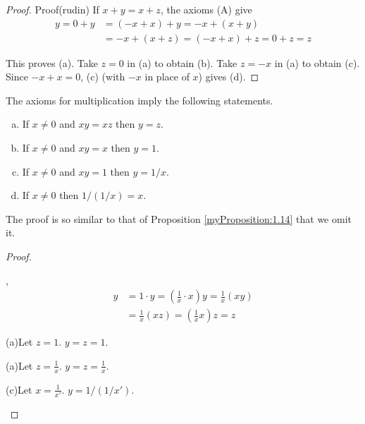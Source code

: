 \begin{proof}
    Proof(rudin)
    If $x + y =x + z$, the axioms (A) give
    \begin{align*}
        y =0+y&=(-x+x)+y=-x+(x+y)\\
        &=-x+(x+z)=(-x+x)+z=0+z=z
    \end{align*}

    This proves (a). Take $z = 0$ in (a) to obtain (b). 
    Take $z= -x$ in (a) to obtain (c).
    Since $-x + x = 0$, (c) (with $-x$ in place of $x$) gives (d).
\end{proof}


\begin{myProposition}
    \label{myProposition:1.15}
    The axioms for multiplication imply the following statements.
    \begin{enumerate}[(a)]
        \item If $x\neq0$ and $xy=xz$ then $y=z$.
        \item If $x\neq0$ and $xy=x$ then $y=1$.
        \item If $x\neq0$ and $xy=1$ then $y=1/x$.
        \item If $x\neq0$ then $1/(1/x) = x$.
    \end{enumerate}
\end{myProposition}

The proof is so similar to that of Proposition \ref{myProposition:1.14} that we omit it.


\begin{proof}
    \begin{asparaenum}[(a)]
        \item ,
        \begin{align*}
            y&=1\cdot y=\left(\frac{1}{x}\cdot x\right)y =\frac{1}{x}\left( xy \right)\\
            &=\frac{1}{x}(xz) =\left(\frac{1}{x}x\right)z = z
        \end{align*}
        \item (a)Let $z=1$. $y=z=1$.
        \item (a)Let $z=\frac{1}{x}$. $y=z=\frac{1}{x}$.
        \item (c)Let $x=\frac{1}{x'}$. $y=1/(1/x')$.
    \end{asparaenum}
\end{proof}

